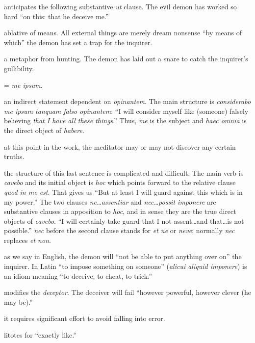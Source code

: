  anticipates the following substantive \textit{ut} clause. The evil demon has worked so hard ``on this: that he deceive me.''

 ablative of means. All external things are merely dream nonsense ``by means of which'' the demon has set a trap for the inquirer.

 a metaphor from hunting. The demon has laid out a snare to catch the inquirer's gullibility.

 = \textit{me ipsum}.

 an indirect statement dependent on \textit{opinantem}. The main structure is \textit{considerabo me ipsum tanquam falso opinantem}: ``I will consider myself like (someone) falsely believing \textit{that I have all these things}.'' Thus, \textit{me} is the subject and \textit{haec omnia} is the direct object of \textit{habere}.

 at this point in the work, the meditator may or may not discover any certain truths.

 the structure of this last sentence is complicated and difficult. The main verb is \textit{cavebo} and its initial object is \textit{hoc} which points forward to the relative clause \textit{quod in me est}. That gives us ``But at least I will guard against this which is in my power.'' The two clauses \textit{ne\dots assentiar} and \textit{nec\dots possit imponere} are substantive clauses in apposition to \textit{hoc}, and in sense they are the true direct objects of \textit{cavebo}. ``I will certainly take guard that I not assent\dots and that\dots is not possible.'' \textit{nec} before the second clause stands for \textit{et ne} or \textit{neve}; normally \textit{nec} replaces \textit{et non}.

 as we say in English, the demon will ``not be able to put anything over on'' the inquirer. In Latin ``to impose something on someone'' (\textit{alicui aliquid imponere}) is an idiom meaning ``to deceive, to cheat, to trick.''

 modifies the \textit{deceptor}. The deceiver will fail ``however powerful, however clever (he may be).''

 it requires significant effort to avoid falling into error.

 litotes for ``exactly like.''

